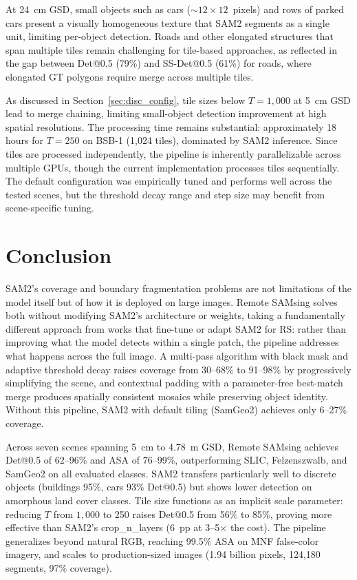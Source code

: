 \documentclass[review,11pt,authoryear]{elsarticle}
\begin{document}
At 24~cm GSD, small objects such as cars (${\sim}12 \times 12$~pixels) and rows of parked cars present a visually homogeneous texture that SAM2 segments as a single unit, limiting per-object detection. Roads and other elongated structures that span multiple tiles remain challenging for tile-based approaches, as reflected in the gap between Det@0.5 (79\%) and SS-Det@0.5 (61\%) for roads, where elongated GT polygons require merge across multiple tiles.

As discussed in Section~\ref{sec:disc_config}, tile sizes below $T = 1{,}000$ at 5~cm GSD lead to merge chaining, limiting small-object detection improvement at high spatial resolutions. The processing time remains substantial: approximately 18 hours for $T = 250$ on BSB-1 (1{,}024 tiles), dominated by SAM2 inference. Since tiles are processed independently, the pipeline is inherently parallelizable across multiple GPUs, though the current implementation processes tiles sequentially. The default configuration was empirically tuned and performs well across the tested scenes, but the threshold decay range and step size may benefit from scene-specific tuning.


\section{Conclusion}
\label{sec:conclusion}

SAM2's coverage and boundary fragmentation problems are not limitations of the model itself but of how it is deployed on large images. Remote SAMsing solves both without modifying SAM2's architecture or weights, taking a fundamentally different approach from works that fine-tune or adapt SAM2 for RS: rather than improving what the model detects within a single patch, the pipeline addresses what happens across the full image. A multi-pass algorithm with black mask and adaptive threshold decay raises coverage from 30--68\% to 91--98\% by progressively simplifying the scene, and contextual padding with a parameter-free best-match merge produces spatially consistent mosaics while preserving object identity. Without this pipeline, SAM2 with default tiling (SamGeo2) achieves only 6--27\% coverage.

Across seven scenes spanning 5~cm to 4.78~m GSD, Remote SAMsing achieves Det@0.5 of 62--96\% and ASA of 76--99\%, outperforming SLIC, Felzenszwalb, and SamGeo2 on all evaluated classes. SAM2 transfers particularly well to discrete objects (buildings 95\%, cars 93\% Det@0.5) but shows lower detection on amorphous land cover classes. Tile size functions as an implicit scale parameter: reducing $T$ from $1{,}000$ to 250 raises Det@0.5 from 56\% to 85\%, proving more effective than SAM2's crop\_n\_layers (6~pp at 3--5$\times$ the cost). The pipeline generalizes beyond natural RGB, reaching 99.5\% ASA on MNF false-color imagery, and scales to production-sized images (1.94 billion pixels, 124{,}180 segments, 97\% coverage).
\end{document}
